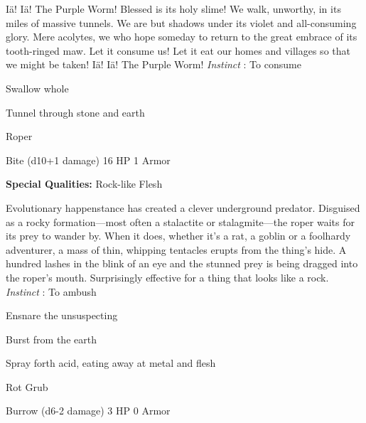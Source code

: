 \startMonsterDescription
Iä! Iä! The Purple Worm! Blessed is its holy slime! We walk, unworthy, in its miles of massive tunnels. We are but shadows under its violet and all-consuming glory. Mere acolytes, we who hope someday to return to the great embrace of its tooth-ringed maw. Let it consume us! Let it eat our homes and villages so that we might be taken! Iä! Iä! The Purple Worm! {\em Instinct} : To consume
\stopMonsterDescription
 
\startitemize[1,packed]

\item Swallow whole

 
\item Tunnel through stone and earth


\stopitemize
 
\startMonsterName
Roper	 
\stopMonsterName
 

Bite (d10+1 damage)	16 HP	1 Armor

 


 
\startMonsterQualities
{\bf Special Qualities:}  Rock-like Flesh
\stopMonsterQualities
 
\startMonsterDescription
Evolutionary happenstance has created a clever underground predator. Disguised as a rocky formation—most often a stalactite or stalagmite—the roper waits for its prey to wander by. When it does, whether it’s a rat, a goblin or a foolhardy adventurer, a mass of thin, whipping tentacles erupts from the thing’s hide. A hundred lashes in the blink of an eye and the stunned prey is being dragged into the roper’s mouth. Surprisingly effective for a thing that looks like a rock. {\em Instinct} : To ambush
\stopMonsterDescription
 
\startitemize[1,packed]

\item Ensnare the unsuspecting

 
\item Burst from the earth

 
\item Spray forth acid, eating away at metal and flesh


\stopitemize
 
\startMonsterName
Rot Grub	 
\stopMonsterName
 

Burrow (d6-2 damage)	3 HP	0 Armor

 


